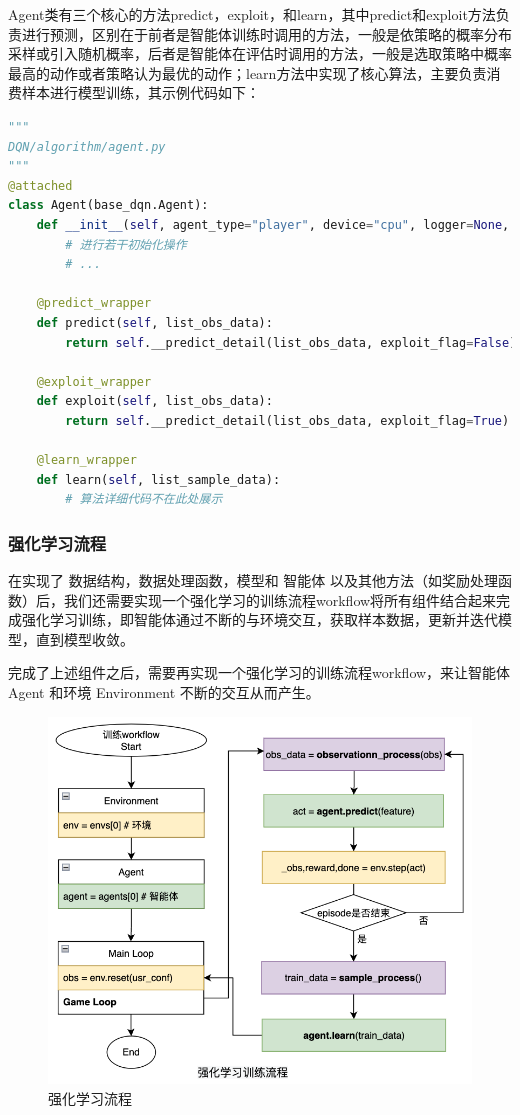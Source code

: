 Agent类有三个核心的方法predict，exploit，和learn，其中predict和exploit方法负责进行预测，区别在于前者是智能体训练时调用的方法，一般是依策略的概率分布采样或引入随机概率，后者是智能体在评估时调用的方法，一般是选取策略中概率最高的动作或者策略认为最优的动作；learn方法中实现了核心算法，主要负责消费样本进行模型训练，其示例代码如下：

\begin{lstlisting}[language=Python]
"""
DQN/algorithm/agent.py
"""
@attached
class Agent(base_dqn.Agent):
    def __init__(self, agent_type="player", device="cpu", logger=None, monitor=None):
        # 进行若干初始化操作
        # ...

    @predict_wrapper
    def predict(self, list_obs_data):
        return self.__predict_detail(list_obs_data, exploit_flag=False)

    @exploit_wrapper
    def exploit(self, list_obs_data):
        return self.__predict_detail(list_obs_data, exploit_flag=True)

    @learn_wrapper
    def learn(self, list_sample_data):
        # 算法详细代码不在此处展示
\end{lstlisting}


\subsubsection{强化学习流程}

在实现了 数据结构，数据处理函数，模型和 智能体 以及其他方法（如奖励处理函数）后，我们还需要实现一个强化学习的训练流程workflow将所有组件结合起来完成强化学习训练，即智能体通过不断的与环境交互，获取样本数据，更新并迭代模型，直到模型收敛。

完成了上述组件之后，需要再实现一个强化学习的训练流程workflow，来让智能体 Agent 和环境 Environment 不断的交互从而产生。


\begin{figure}[H]
    \centering
    \includegraphics[width=0.8\linewidth]{pic/reinforcement.png}
    \caption{ 强化学习流程}
    \label{reinforcement}
\end{figure}
